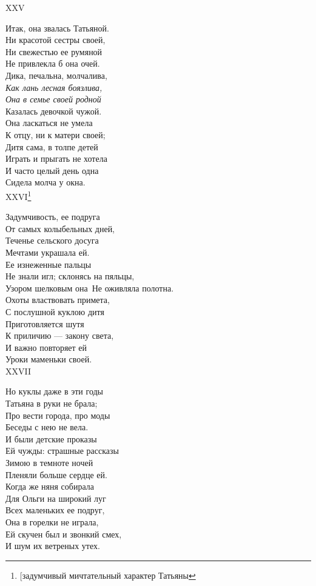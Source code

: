 XXV

Итак, она звалась Татьяной.\\
Ни красотой сестры своей,\\
Ни свежестью ее румяной\\
Не привлекла б она очей.\\
Дика, печальна, молчалива,\\
\emph{Как лань лесная боязлива,\\
Она в семье своей родной}\\
Казалась девочкой чужой.\\
Она ласкаться не умела\\
К отцу, ни к матери своей;\\
Дитя сама, в толпе детей\\
Играть и прыгать не хотела\\
И часто целый день одна\\
Сидела молча у окна.\\

XXVI\footnote{[задумчивый мичтательный характер Татьяны}

Задумчивость, ее подруга\\
От самых колыбельных дней,\\
Теченье сельского досуга\\
Мечтами украшала ей.\\
Ее изнеженные пальцы\\
Не знали игл; склонясь на пяльцы,\\
Узором шелковым она\
Не оживляла полотна.\\
Охоты властвовать примета,\\
С послушной куклою дитя\\
Приготовляется шутя\\
К приличию — закону света,\\
И важно повторяет ей\\
Уроки маменьки своей.\\

XXVII

Но куклы даже в эти годы\\
Татьяна в руки не брала;\\
Про вести города, про моды\\
Беседы с нею не вела.\\
И были детские проказы\\
Ей чужды: страшные рассказы\\
Зимою в темноте ночей\\
Пленяли больше сердце ей.\\
Когда же няня собирала\\
Для Ольги на широкий луг\\
Всех маленьких ее подруг,\\
Она в горелки не играла,\\
Ей скучен был и звонкий смех,\\
И шум их ветреных утех.\\

